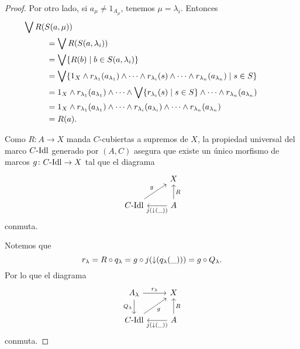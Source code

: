 \begin{proof}
Por otro lado, si $a_\mu\neq 1_{A_\mu}$, tenemos $\mu=\lambda_i$.
Entonces
\begin{align*}
    &\hspace{-10mm}\Sup R(S(a,\mu)) \\
    &= \Sup R(S(a,\lambda_i)) \\
    &= \Sup\{R(b) \mid b\in S(a,\lambda_i)\} \\
    &= \Sup\{ 1_X\inf r_{\lambda_1}(a_{\lambda_1})\inf
        \cdots \inf r_{\lambda_i}(s)\inf\cdots\inf r_{\lambda_n}(a_{\lambda_n}) \mid s\in S\} \\
    &= 1_X\inf r_{\lambda_1}(a_{\lambda_1})\inf \cdots
        \inf\Sup\{ r_{\lambda_i}(s) \mid s\in S\} \inf
        \cdots\inf r_{\lambda_n}(a_{\lambda_n}) \\
    &= 1_X\inf r_{\lambda_1}(a_{\lambda_1})\inf \cdots
        \inf r_{\lambda_i}(a_{\lambda_i}) \inf
        \cdots\inf r_{\lambda_n}(a_{\lambda_n})
        \\
    &= R(a).
\end{align*}

Como $R:A\to X$ manda $C$-cubiertas a supremos de $X$,
la propiedad universal del marco $C\text{-}\mathrm{Idl}$ generado por $(A,C)$
asegura que existe un único morfismo de marcos
$g\colon C\text{-}\mathrm{Idl}\to X$ tal que el diagrama
\[
    \begin{tikzcd}[ampersand replacement=\&]
        \& X  \\
        C\Idl \ar[ru,"g"] \& A \ar[u,"R"'] \ar[l,"{j(\down({\_}))}"]
    \end{tikzcd}
\]
conmuta.

Notemos que
\[r_\lambda=R\circ q_\lambda=g\circ j({\downarrow}(q_\lambda(\_)))=g\circ Q_\lambda.\]
Por lo que el diagrama
\[
    \begin{tikzcd}[ampersand replacement=\&]
        A_\lambda \arrow[d, "Q_\lambda"'] \arrow[r, "r_\lambda"]
        \& X \\
        C\Idl \arrow[ru, "g"']
        \& A \arrow[l, "j(\down(\_))"] \arrow[u, "R"']
    \end{tikzcd}
\]
conmuta.
\end{proof}

